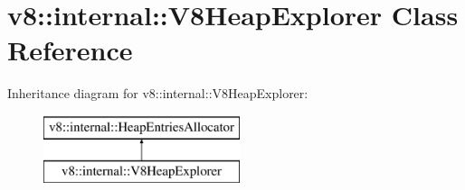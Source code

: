 \hypertarget{classv8_1_1internal_1_1_v8_heap_explorer}{}\section{v8\+:\+:internal\+:\+:V8\+Heap\+Explorer Class Reference}
\label{classv8_1_1internal_1_1_v8_heap_explorer}
Inheritance diagram for v8\+:\+:internal\+:\+:V8\+Heap\+Explorer\+:\begin{figure}[H]
\begin{center}
\leavevmode
\includegraphics[height=2.000000cm]{classv8_1_1internal_1_1_v8_heap_explorer}
\end{center}
\end{figure}
